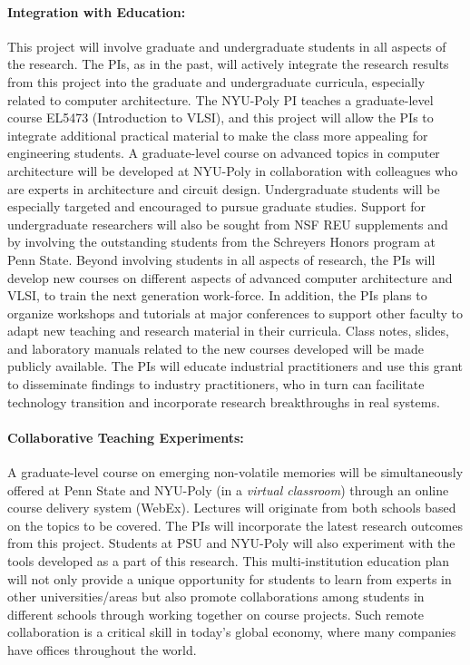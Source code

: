 \paragraph{\textbf{Integration with Education:}} This project will
involve graduate and undergraduate students in all aspects of the
research. The PIs, as in the past, will actively integrate the
research results from this project into the graduate and
undergraduate curricula, especially related to computer architecture.
The NYU-Poly
PI teaches a graduate-level course EL5473 (Introduction to VLSI), and this
project will allow the PIs to integrate additional practical
material to make the class more appealing for engineering
students. A graduate-level course on advanced topics in computer architecture
will be developed at NYU-Poly in collaboration with colleagues who are
experts in architecture and circuit design. Undergraduate students
will be especially targeted and encouraged to pursue graduate
studies.  Support for undergraduate researchers will also be
sought from NSF REU supplements and  by involving
the outstanding students from the Schreyers Honors program at Penn
State.
Beyond involving students in all aspects of research, the PIs will
develop new courses on different aspects of advanced computer architecture and VLSI, to train the next generation work-force. In
addition, the PIs plans to organize workshops and tutorials at
major conferences to support other faculty to adapt new teaching
and research material in their curricula. Class notes, slides, and
laboratory manuals related to the new courses developed will be
made publicly available.
The PIs will educate industrial
practitioners and use this grant to disseminate findings to
industry practitioners, who in turn can facilitate technology
transition and incorporate research breakthroughs in real systems.


\paragraph{\textbf{Collaborative Teaching Experiments}:}  A graduate-level course
on emerging non-volatile memories will be simultaneously offered at Penn State and NYU-Poly (in a \textit{virtual classroom}) through an online course
delivery system (WebEx). Lectures will originate from both schools
based on the topics to be covered. The PIs will incorporate the
latest research outcomes from this project. Students at PSU and
NYU-Poly will also experiment with the tools developed as a part of
this research. This multi-institution education plan will not only
provide a unique opportunity for students to learn from experts in
other universities/areas but also promote collaborations among
students in different schools through working together on course
projects. Such remote collaboration is a critical skill in today's
global economy, where many companies have offices throughout the
world.

